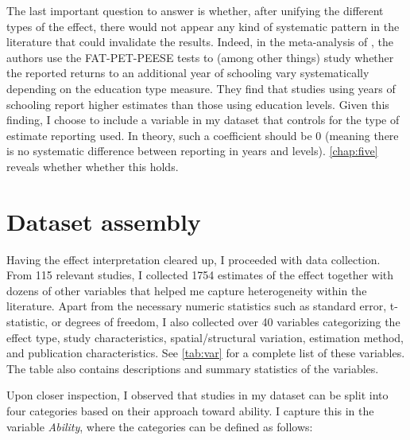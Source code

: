 The last important question to answer is whether, after unifying the different types of the effect, there would not appear any kind of systematic pattern in the literature that could invalidate the results. Indeed, in the meta-analysis of \cite{churchill2018meta}, the authors use the FAT-PET-PEESE tests to (among other things) study whether the reported returns to an additional year of schooling vary systematically depending on the education type measure. They find that studies using years of schooling report higher estimates than those using education levels. Given this finding, I choose to include a variable in my dataset that controls for the type of estimate reporting used. In theory, such a coefficient should be 0 (meaning there is no systematic difference between reporting in years and levels). \autoref{chap:five} reveals whether whether this holds.

\section{Dataset assembly}
\label{sec:data_set}

Having the effect interpretation cleared up, I proceeded with data collection. From 115 relevant studies, I collected 1754 estimates of the effect together with dozens of other variables that helped me capture heterogeneity within the literature. Apart from the necessary numeric statistics such as standard error, t-statistic, or degrees of freedom, I also collected over 40 variables categorizing the effect type, study characteristics, spatial/structural variation, estimation method, and publication characteristics. See \autoref{tab:var} for a complete list of these variables. The table also contains descriptions and summary statistics of the variables.

Upon closer inspection, I observed that studies in my dataset can be split into four categories based on their approach toward ability. I capture this in the variable \textit{Ability}, where the categories can be defined as follows:

